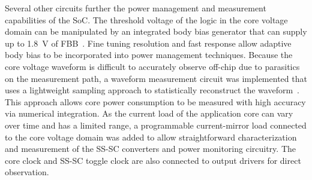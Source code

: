 \documentclass[graybox]{svmult}
\begin{document}

Several other circuits further the power management and measurement capabilities of the SoC.
The threshold voltage of the logic in the core voltage domain can be manipulated by an integrated body bias generator that can supply up to \SI{1.8}{\volt} of FBB~\cite{Blagojevic2016}.
Fine tuning resolution and fast response allow adaptive body bias to be incorporated into power management techniques.
Because the core voltage waveform is difficult to accurately observe off-chip due to parasitics on the measurement path, a waveform measurement circuit was implemented that uses a lightweight sampling approach to statistically reconstruct the waveform~\cite{Cochet2016}.
This approach allows core power consumption to be measured with high accuracy via numerical integration.
As the current load of the application core can vary over time and has a limited range, a programmable current-mirror load connected to the core voltage domain was added to allow straightforward characterization and measurement of the SS-SC converters and power monitoring circuitry.
The core clock and SS-SC toggle clock are also connected to output drivers for direct observation.
\end{document}
